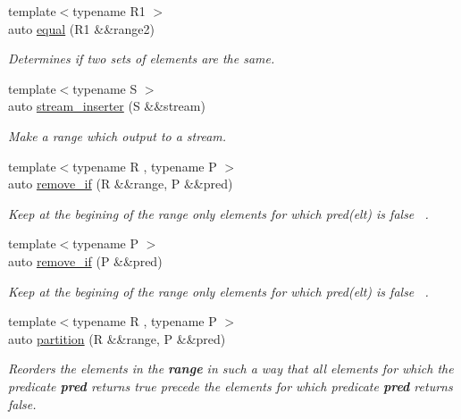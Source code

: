\begin{DoxyCompactItemize}
{\footnotesize template$<$typename R1 $>$ }\\auto \mbox{\hyperlink{namespacerah_a3434aacc26937d3ff50b5db4286feda6}{equal}} (R1 \&\&range2)
\begin{DoxyCompactList}\small\item\em Determines if two sets of elements are the same. \end{DoxyCompactList}\item 
{\footnotesize template$<$typename S $>$ }\\auto \mbox{\hyperlink{namespacerah_a3f7b590b1bd8a44b5b2d6f4e35f1837c}{stream\+\_\+inserter}} (S \&\&stream)
\begin{DoxyCompactList}\small\item\em Make a range which output to a stream. \end{DoxyCompactList}\item 
{\footnotesize template$<$typename R , typename P $>$ }\\auto \mbox{\hyperlink{namespacerah_afba9495316f20f6caee735c15feb349c}{remove\+\_\+if}} (R \&\&range, P \&\&pred)
\begin{DoxyCompactList}\small\item\em Keep at the begining of the range only elements for which pred(elt) is false~\newline
. \end{DoxyCompactList}\item 
{\footnotesize template$<$typename P $>$ }\\auto \mbox{\hyperlink{namespacerah_af598cf91c554f6d6938c320578e6bb02}{remove\+\_\+if}} (P \&\&pred)
\begin{DoxyCompactList}\small\item\em Keep at the begining of the range only elements for which pred(elt) is false~\newline
. \end{DoxyCompactList}\item 
{\footnotesize template$<$typename R , typename P $>$ }\\auto \mbox{\hyperlink{namespacerah_a97ae3ed90fe486c2dd3a90fee811bcd7}{partition}} (R \&\&range, P \&\&pred)
\begin{DoxyCompactList}\small\item\em Reorders the elements in the {\bfseries{range}} in such a way that all elements for which the predicate {\bfseries{pred}} returns {\ttfamily true} precede the elements for which predicate {\bfseries{pred}} returns {\ttfamily false}. \end{DoxyCompactList}\item 

\end{DoxyCompactItemize}
